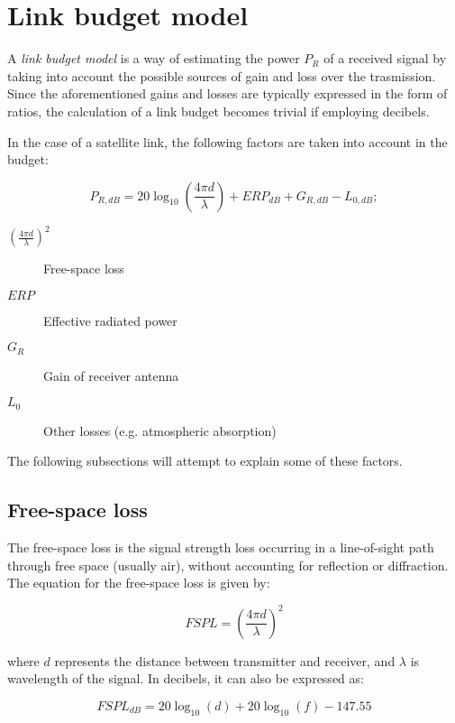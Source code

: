 \section{Link budget model}
A \emph{link budget model} is a way of estimating the power $P_R$ of a received signal by taking into account the possible sources of gain and loss over the trasmission.
Since the aforementioned gains and losses are typically expressed in the form of ratios, the calculation of a link budget becomes trivial if employing decibels.

In the case of a satellite link, the following factors are taken into account in the budget:

\begin{equation}
	P_{R, dB} = 20\log_{10}\left(\frac{4 \pi d}{\lambda}\right) + {ERP}_{dB} + G_{R, dB} - L_{0, dB};
\end{equation}

\begin{description}
	\item[$(\frac{4 \pi d}{\lambda})^2$] Free-space loss
	\item[$ERP$] Effective radiated power
	\item[$G_R$] Gain of receiver antenna
	\item[$L_0$] Other losses (e.g. atmospheric absorption)
\end{description}

The following subsections will attempt to explain some of these factors.

\subsection{Free-space loss}
The free-space loss is the signal strength loss occurring in a line-of-sight path through free space (usually air), without accounting for reflection or diffraction. The equation for the free-space loss is given by:

\begin{equation}
	{FSPL} = \left(\frac{4 \pi d}{\lambda}\right)^2
\end{equation}

where $d$ represents the distance between transmitter and receiver, and $\lambda$ is wavelength of the signal.
In decibels, it can also be expressed as:

\begin{equation}
	{FSPL}_{dB} = 20\log_{10}(d) + 20\log_{10}(f) - 147.55
\end{equation}


